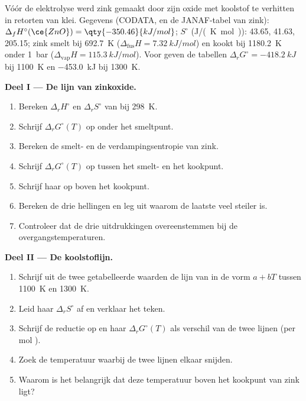 \begin{problem}
\label{pb:b2:ellingham:1}
Vóór de elektrolyse werd zink gemaakt door zijn oxide met koolstof te verhitten in
retorten van klei. Gegevens (CODATA, en de JANAF-tabel van zink): $\Delta_f H^\circ(\ce{ZnO})
= \qty{-350.46}{kJ/mol}$; $S^\circ$ (\unit{J/(K.mol)}):  43.65, 
41.63,  205.15; zink smelt bij \qty{692.7}{K} ($\Delta_{\text{fus}}H =
\qty{7.32}{kJ/mol}$) en kookt bij \qty{1180.2}{K} onder \qty{1}{bar}
($\Delta_{\text{vap}}H = \qty{115.3}{kJ/mol}$). Voor  geven de
tabellen $\Delta_r G^\circ = \qty{-418.2}{kJ}$ bij \qty{1100}{K} en
\qty{-453.0}{kJ} bij \qty{1300}{K}.

\medskip
\noindent\textbf{Deel I --- De lijn van zinkoxide.}
\begin{enumerate}
  \item Bereken $\Delta_r H^\circ$ en $\Delta_r S^\circ$ van  bij \qty{298}{K}.
  \item Schrijf $\Delta_r G^\circ(T)$ op onder het smeltpunt.
  \item Bereken de smelt- en de verdampingsentropie van zink.
  \item Schrijf $\Delta_r G^\circ(T)$ op tussen het smelt- en het kookpunt.
  \item Schrijf haar op boven het kookpunt.
  \item Bereken de drie hellingen en leg uit waarom de laatste veel steiler is.
  \item Controleer dat de drie uitdrukkingen overeenstemmen bij de overgangstemperaturen.
\end{enumerate}

\medskip
\noindent\textbf{Deel II --- De koolstoflijn.}
\begin{enumerate}[resume]
  \item Schrijf uit de twee getabelleerde waarden de lijn van  in
        de vorm $a + bT$ tussen \qty{1100}{K} en \qty{1300}{K}.
  \item Leid haar $\Delta_r S^\circ$ af en verklaar het teken.
  \item Schrijf de reductie  op en haar $\Delta_r
        G^\circ(T)$ als verschil van de twee lijnen (per mol ).
  \item Zoek de temperatuur waarbij de twee lijnen elkaar snijden.
  \item Waarom is het belangrijk dat deze temperatuur boven het kookpunt
        van zink ligt?
\end{enumerate}


\end{problem}

